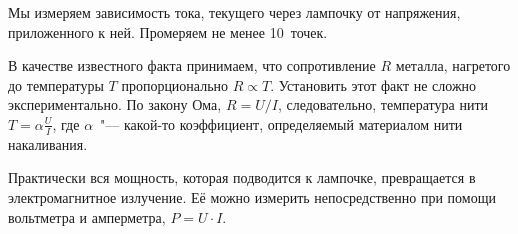 \begin{enumerate}
{        \item Мы измеряем зависимость тока, текущего через лампочку от напряжения, приложенного к ней. Промеряем не менее 10~точек.

        \item В качестве известного факта принимаем, что сопротивление $R$ металла, нагретого до температуры $T$ пропорционально $R \propto T$. Установить этот факт не сложно экспериментально. По закону Ома, $R = U/I$, следовательно, температура нити $T = \alpha \frac{U}{I}$, где $\alpha$~"--- какой-то коэффициент, определяемый материалом нити накаливания.

        \item Практически вся мощность, которая подводится к лампочке, превращается в электромагнитное излучение. Её можно измерить непосредственно при помощи вольтметра и амперметра, $P=U\cdot I$.

}
\end{enumerate}
